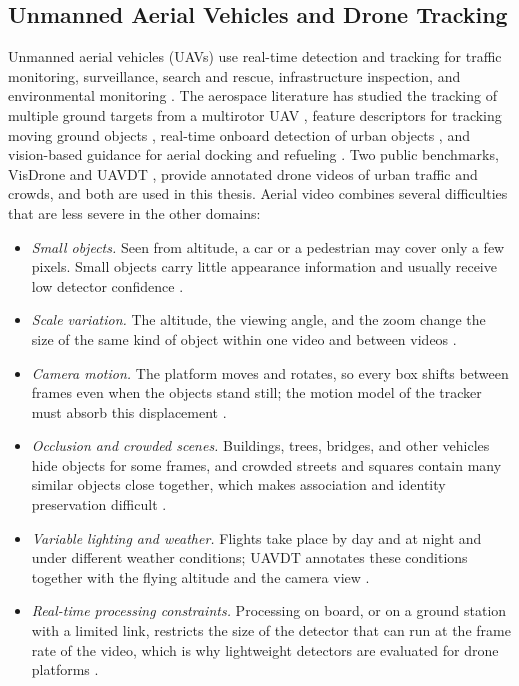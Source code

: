 \subsection{Unmanned Aerial Vehicles and Drone Tracking}\label{sec:bg-app-uav}
Unmanned aerial vehicles (UAVs) use real-time detection and tracking for traffic monitoring, surveillance, search and rescue, infrastructure inspection, and environmental monitoring \cite{wu2022uavsurvey,kanellakis2017uavvision,bakirci2025lowpower}. The aerospace literature has studied the tracking of multiple ground targets from a multirotor UAV \cite{miller2015multitarget}, feature descriptors for tracking moving ground objects \cite{desai2017uavfeature}, real-time onboard detection of urban objects \cite{lu2024uavdetection}, and vision-based guidance for aerial docking and refueling \cite{choi2022docking,parsons2019refueling}. Two public benchmarks, VisDrone \cite{zhu2022visdrone} and UAVDT \cite{du2018uavdt}, provide annotated drone videos of urban traffic and crowds, and both are used in this thesis. Aerial video combines several difficulties that are less severe in the other domains:
\begin{itemize}
\item \emph{Small objects.} Seen from altitude, a car or a pedestrian may cover only a few pixels. Small objects carry little appearance information and usually receive low detector confidence \cite{cheng2023smallobject,dai2026lsoyolo}.
\item \emph{Scale variation.} The altitude, the viewing angle, and the zoom change the size of the same kind of object within one video and between videos \cite{du2018uavdt,zhu2022visdrone}.
\item \emph{Camera motion.} The platform moves and rotates, so every box shifts between frames even when the objects stand still; the motion model of the tracker must absorb this displacement \cite{liu2022uavmot}.
\item \emph{Occlusion and crowded scenes.} Buildings, trees, bridges, and other vehicles hide objects for some frames, and crowded streets and squares contain many similar objects close together, which makes association and identity preservation difficult \cite{zhu2022visdrone,li2025motreview}.
\item \emph{Variable lighting and weather.} Flights take place by day and at night and under different weather conditions; UAVDT annotates these conditions together with the flying altitude and the camera view \cite{du2018uavdt}.
\item \emph{Real-time processing constraints.} Processing on board, or on a ground station with a limited link, restricts the size of the detector that can run at the frame rate of the video, which is why lightweight detectors are evaluated for drone platforms \cite{bakirci2025lowpower}.
\end{itemize}

